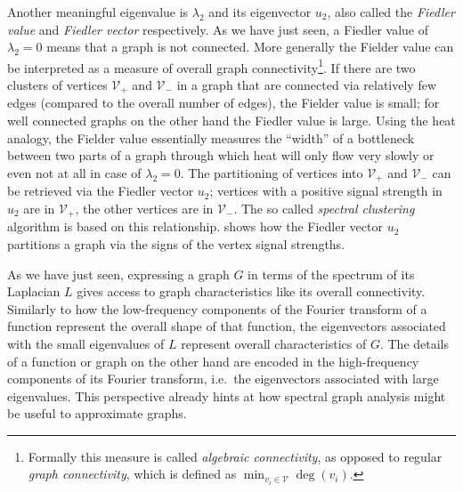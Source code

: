 Another meaningful eigenvalue is $\lambda_2$ and its eigenvector $u_2$, also called the \textit{Fiedler value} and \textit{Fiedler vector} respectively.
As we have just seen, a Fiedler value of $\lambda_2 = 0$ means that a graph is not connected.
More generally the Fielder value can be interpreted as a measure of overall graph connectivity\footnote{%
	Formally this measure is called \textit{algebraic connectivity}, as opposed to regular \textit{graph connectivity}, which is defined as $\min_{v_i \in \mathcal{V}} \deg(v_i)$.
}.
If there are two clusters of vertices $\mathcal{V}_+$ and $\mathcal{V}_-$ in a graph that are connected via relatively few edges (compared to the overall number of edges), the Fielder value is small;
for well connected graphs on the other hand the Fiedler value is large.
Using the heat analogy, the Fielder value essentially measures the ``width'' of a bottleneck between two parts of a graph through which heat will only flow very slowly or even not at all in case of $\lambda_2 = 0$.
The partitioning of vertices into $\mathcal{V}_+$ and $\mathcal{V}_-$ can be retrieved via the Fiedler vector $u_2$;
vertices with a positive signal strength in $u_2$ are in $\mathcal{V}_+$, the other vertices are in $\mathcal{V}_-$.
The so called \textit{spectral clustering} algorithm is based on this relationship.
 shows how the Fiedler vector $u_2$ partitions a graph via the signs of the vertex signal strengths.

As we have just seen, expressing a graph $G$ in terms of the spectrum of its Laplacian $L$ gives access to graph characteristics like its overall connectivity.
Similarly to how the low-frequency components of the Fourier transform of a function represent the overall shape of that function, the eigenvectors associated with the small eigenvalues of $L$ represent overall characteristics of $G$.
The details of a function or graph on the other hand are encoded in the high-frequency components of its Fourier transform, i.e.\  the eigenvectors associated with large eigenvalues.
This perspective already hints at how spectral graph analysis might be useful to approximate graphs.
